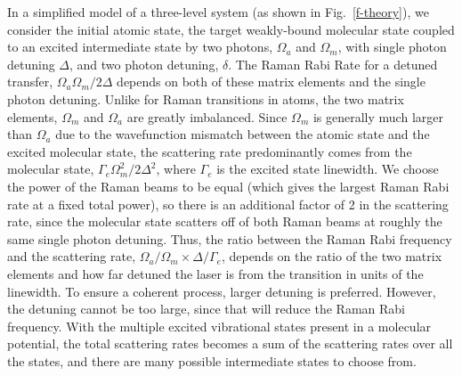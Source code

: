 \documentclass[aps,prl,twocolumn,groupedaddress]{revtex4-1}
\begin{document}
In a simplified model of a three-level system (as shown in Fig.~\ref{f-theory}), we consider the initial atomic state, the target weakly-bound molecular state coupled to an excited intermediate state by two photons, $\Omega_a$ and $\Omega_m$, with single photon detuning $ \Delta $, and two photon detuning, $ \delta$.  %
The Raman Rabi Rate for a detuned transfer, $ \Omega_a\Omega_m / 2\Delta$ depends on both of these matrix elements and the single photon detuning. Unlike for Raman transitions in atoms, the two matrix elements, $ \Omega_m$ and $ \Omega_a$ are greatly imbalanced. Since $ \Omega_m $ is generally much larger than $ \Omega_a $ due to the wavefunction mismatch between the atomic state and the excited molecular state, the scattering rate predominantly comes from the molecular state, $ \Gamma_e \Omega_m^2 / 2\Delta^2$, where $ \Gamma_e $ is the excited state linewidth. We choose the power of the Raman beams to be equal (which gives the largest Raman Rabi rate at a fixed total power), so there is an additional factor of 2 in the scattering rate, since the molecular state scatters off of both Raman beams at roughly the same single photon detuning. Thus, the ratio between the Raman Rabi frequency and the scattering rate, $ \Omega_a/\Omega_m \times \Delta/\Gamma_e $, depends on the ratio of the two matrix elements and how far detuned the laser is from the transition in units of the linewidth. To ensure a coherent process, larger detuning is preferred. However, the detuning cannot be too large, since that will reduce the Raman Rabi frequency. With the multiple excited vibrational states present in a molecular potential, the total scattering rates becomes a sum of the scattering rates over all the states, and there are many possible intermediate states to choose from.
\end{document}
